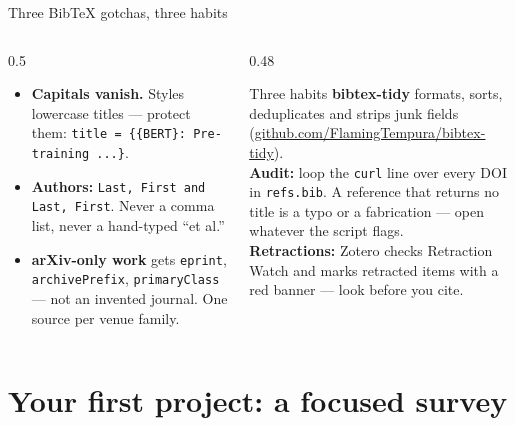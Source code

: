 \documentclass[aspectratio=169,11pt]{beamer}
\newcommand{\code}[1]{\texttt{\small #1}}
\newcommand{\lnk}[2]{\href{#1}{\color{brandlight}\underline{#2}}}
\newcommand{\key}[1]{\textbf{\color{brand}#1}}
\begin{document}
\begin{frame}{Three BibTeX gotchas, three habits}
\begin{columns}[T]
\begin{column}{0.5\textwidth}
\footnotesize
\begin{itemize}
  \item \key{Capitals vanish.} Styles lowercase titles --- protect them:
        \code{title = \{\{BERT\}: Pre-training ...\}}.
  \item \key{Authors:} \code{Last, First and Last, First}. Never a comma
        list, never a hand-typed ``et al.''
  \item \key{arXiv-only work} gets \code{eprint}, \code{archivePrefix},
        \code{primaryClass} --- not an invented journal. One source per venue
        family.
\end{itemize}
\end{column}
\begin{column}{0.48\textwidth}
\begin{block}{Three habits}
\footnotesize
\key{bibtex-tidy} formats, sorts, deduplicates and strips junk fields
(\lnk{https://github.com/FlamingTempura/bibtex-tidy}{github.com/FlamingTempura/bibtex-tidy}).\\[3pt]
\key{Audit:} loop the \code{curl} line over every DOI in \code{refs.bib}. A
reference that returns no title is a typo or a fabrication --- open whatever
the script flags.\\[3pt]
\key{Retractions:} Zotero checks Retraction Watch and marks retracted items
with a red banner --- look before you cite.
\end{block}
\end{column}
\end{columns}
\end{frame}

\section{Your first project: a focused survey}
\end{document}
